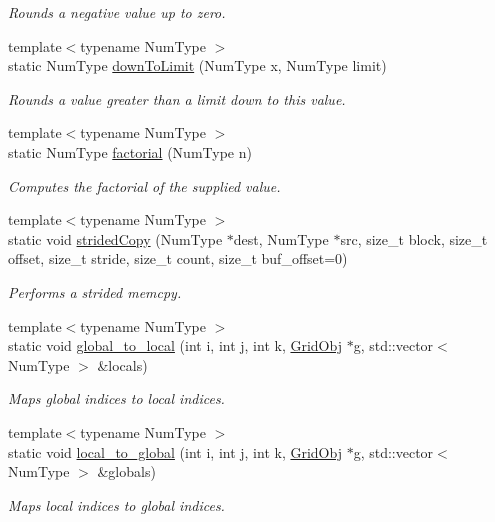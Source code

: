 \begin{DoxyCompactItemize}
\begin{DoxyCompactList}\small\item\em Rounds a negative value up to zero. \end{DoxyCompactList}\item 
{\footnotesize template$<$typename Num\+Type $>$ }\\static Num\+Type \hyperlink{class_grid_utils_abd4068e22339d5272ca551f8cbddec26}{down\+To\+Limit} (Num\+Type x, Num\+Type limit)
\begin{DoxyCompactList}\small\item\em Rounds a value greater than a limit down to this value. \end{DoxyCompactList}\item 
{\footnotesize template$<$typename Num\+Type $>$ }\\static Num\+Type \hyperlink{class_grid_utils_a57edeaeba2d67d187a9edd0b560fe0c2}{factorial} (Num\+Type n)
\begin{DoxyCompactList}\small\item\em Computes the factorial of the supplied value. \end{DoxyCompactList}\item 
{\footnotesize template$<$typename Num\+Type $>$ }\\static void \hyperlink{class_grid_utils_aa3ca6e20ef4fa927cb845956d7565b1e}{strided\+Copy} (Num\+Type $\ast$dest, Num\+Type $\ast$src, size\+\_\+t block, size\+\_\+t offset, size\+\_\+t stride, size\+\_\+t count, size\+\_\+t buf\+\_\+offset=0)
\begin{DoxyCompactList}\small\item\em Performs a strided memcpy. \end{DoxyCompactList}\item 
{\footnotesize template$<$typename Num\+Type $>$ }\\static void \hyperlink{class_grid_utils_a28cba8aa8cbe5dd20fa3405e2f46eeb2}{global\+\_\+to\+\_\+local} (int i, int j, int k, \hyperlink{class_grid_obj}{Grid\+Obj} $\ast$g, std\+::vector$<$ Num\+Type $>$ \&locals)
\begin{DoxyCompactList}\small\item\em Maps global indices to local indices. \end{DoxyCompactList}\item 
{\footnotesize template$<$typename Num\+Type $>$ }\\static void \hyperlink{class_grid_utils_ac3e122b19b2ee0e159b3025b2858d895}{local\+\_\+to\+\_\+global} (int i, int j, int k, \hyperlink{class_grid_obj}{Grid\+Obj} $\ast$g, std\+::vector$<$ Num\+Type $>$ \&globals)
\begin{DoxyCompactList}\small\item\em Maps local indices to global indices. \end{DoxyCompactList}\end{DoxyCompactItemize}
